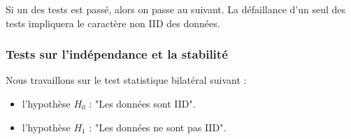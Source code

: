 Si un des tests est passé, alors on passe au suivant. La défaillance d'un seul des tests impliquera le caractère non IID des données. 


\subsubsection{Tests sur l'indépendance et la stabilité}
Nous travaillons sur le test statistique bilatéral suivant : 
\begin{itemize}
\item l'hypothèse $H_0$ : "Les données sont IID". 
\item l'hypothèse $H_1$ : "Les données ne sont pas IID". \\

\end{itemize}


